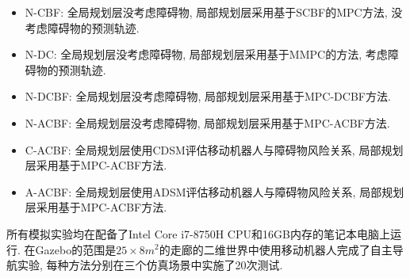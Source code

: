 \documentclass[preprint,5p,times,twocolumn]{elsarticle}
\begin{document}
\begin{itemize}
\item {N-CBF}\citep{Zeng2020SafetyCriticalMP}: 全局规划层没考虑障碍物, 局部规划层采用基于SCBF的MPC方法, 没考虑障碍物的预测轨迹.
\item {N-DC}\citep{Brito2019ModelPC}: 全局规划层没考虑障碍物, 局部规划层采用基于MMPC的方法, 考虑障碍物的预测轨迹.
\item {N-DCBF}\citep{jian2022dynamicCB}: 全局规划层没考虑障碍物, 局部规划层采用基于MPC-DCBF方法.
\item {N-ACBF}: 全局规划层没考虑障碍物, 局部规划层采用基于MPC-ACBF方法.
\item {C-ACBF}: 全局规划层使用CDSM评估移动机器人与障碍物风险关系, 局部规划层采用基于MPC-ACBF方法. 
\item {A-ACBF}: 全局规划层使用ADSM评估移动机器人与障碍物风险关系, 局部规划层采用基于MPC-ACBF方法.
\end{itemize}

所有模拟实验均在配备了Intel Core i7-8750H CPU和16GB内存的笔记本电脑上运行. 在Gazebo的范围是$25\times8m^2$的走廊的二维世界中使用移动机器人完成了自主导航实验, 每种方法分别在三个仿真场景中实施了20次测试.
\end{document}
